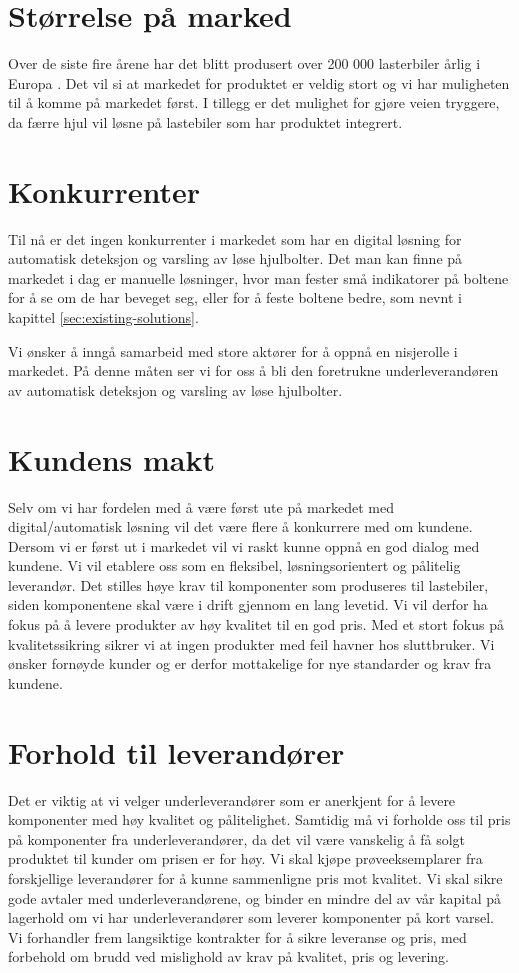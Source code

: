 \section{Størrelse på marked}
Over de siste fire årene har det blitt produsert over 200 000 lasterbiler årlig 
i Europa \cite{lastebilprod-DAF}. Det vil si at markedet for produktet er 
veldig stort og vi har muligheten til å komme på markedet først. I tillegg er 
det mulighet for gjøre veien tryggere, da færre hjul vil løsne på lastebiler 
som har produktet integrert.

\section{Konkurrenter}
Til nå er det ingen konkurrenter i markedet som har en digital løsning for 
automatisk deteksjon og varsling av løse hjulbolter. Det man kan finne på 
markedet i dag er manuelle løsninger, hvor man fester små indikatorer på 
boltene for å se om de har beveget seg, eller for å feste boltene bedre, som nevnt i kapittel \ref{sec:existing-solutions}.

Vi ønsker å inngå samarbeid med store aktører for å oppnå en nisjerolle i 
markedet. På denne måten ser vi for oss å bli den foretrukne 
underleverandøren av automatisk deteksjon og varsling av løse hjulbolter.

\section{Kundens makt}
Selv om vi har fordelen med å være først ute på markedet med digital/automatisk løsning vil det være flere å konkurrere med om kundene. Dersom vi er først ut i markedet vil 
vi raskt kunne oppnå en god dialog med kundene. Vi vil etablere oss som en 
fleksibel, løsningsorientert og pålitelig leverandør. Det stilles høye krav 
til komponenter som produseres til lastebiler, siden komponentene skal være i 
drift gjennom en lang levetid. Vi vil derfor ha fokus på å levere produkter 
av høy kvalitet til en god pris. Med et stort fokus på 
kvalitetssikring sikrer vi at ingen produkter med feil havner hos 
sluttbruker. Vi ønsker fornøyde kunder og er derfor mottakelige for nye 
standarder og krav fra kundene. 

\section{Forhold til leverandører}
Det er viktig at vi velger underleverandører som er anerkjent for å levere 
komponenter med høy kvalitet og pålitelighet. Samtidig må vi forholde oss til 
pris på komponenter fra underleverandører, da det vil være vanskelig å få 
solgt produktet til kunder om prisen er for høy. Vi skal kjøpe 
prøveeksemplarer fra forskjellige leverandører for å kunne sammenligne pris 
mot kvalitet. Vi skal sikre gode avtaler med underleverandørene, og binder en 
mindre del av vår kapital på lagerhold om vi har underleverandører som 
leverer komponenter på kort varsel. Vi forhandler frem langsiktige kontrakter 
for å sikre leveranse og pris, med forbehold om brudd ved mislighold av krav 
på kvalitet, pris og levering. 


